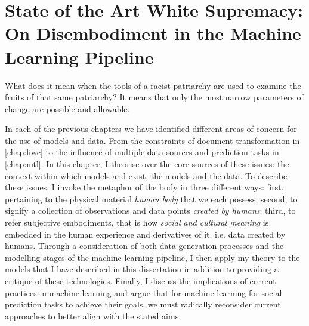 \ifpdf
    \graphicspath{{Chapter7/Figs/Raster/}{Chapter7/Figs/PDF/}{Chapter7/Figs/}}
\else
    \graphicspath{{Chapter7/Figs/Vector/}{Chapter7/Figs/}}
\fi


\chapter[State of the Art White Supremacy: On Disembodiment in the Machine Learning Pipeline]{State of the Art White Supremacy: On Disembodiment in the Machine Learning Pipeline\footnotemark{}}\label{chap:disembodied}

\begin{citequote}{\citet[p.110-111]{Lorde:1984}}
What does it mean when the tools of a racist patriarchy are used to examine the fruits of that same patriarchy?  It means that only the most narrow parameters of change are possible and allowable.
\end{citequote}

In each of the previous chapters we have identified different areas of concern for the use of models and data. From the constraints of document transformation in \autoref{chap:liwc} to the influence of multiple data sources and prediction tasks in \autoref{chap:mtl}. In this chapter, I theorise over the core sources of these issues: the context within which models and exist, the models and the data.
To describe these issues, I invoke the metaphor of the body in three different ways: first, pertaining to the physical material \textit{human body} that we each possess; second, to signify a collection of observations and data points \textit{created by humans}; third, to refer subjective embodiments, that is how \textit{social and cultural meaning} is embedded in the human experience and derivatives of it, i.e. data created by humans.
Through a consideration of both data generation processes and the modelling stages of the machine learning pipeline, I then apply my theory to the models that I have described in this dissertation in addition to providing a critique of these technologies. 
Finally, I discuss the implications of current practices in machine learning and argue that for machine learning for social prediction tasks to achieve their goals, we must radically reconsider current approaches to better align with the stated aims.

